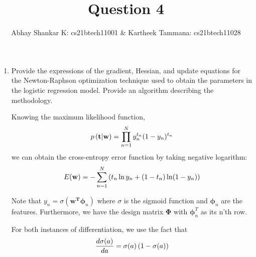 \documentclass[reqno]{amsart}
\begin{document}
    \title{Question 4}
    \author{Abhay Shankar K: cs21btech11001 \& Kartheek Tammana: cs21btech11028}
    \maketitle

    \begin{enumerate}[label=\textbf{(\Roman*)}]
        \item \question Provide the expressions of the gradient, Hessian, and update equations for the Newton-Raphson optimization technique used to obtain the parameters in the logistic regression model. Provide an algorithm describing the methodology.
        
        \solution
        Knowing the maximum likelihood function, 
        \[p\left({\mathbf{t}} \middle| {\mathbf{w}}\right) = \prod_{n = 1}^{N} y_n^{t_n} (1 - y_n)^{t_n}\]
        we can obtain the cross-entropy error function by taking negative logarithm: 
        \begin{equation}
            E(\mathbf{w}) = - \sum_{n = 1}^{N} \left(t_n \ln y_n + (1 - t_n) \ln (1 - y_n)\right) \label{eq:cross-entropy}
        \end{equation}
        
        Note that \(y_n = \sigma(\mathbf{w^T}\boldsymbol{\phi}_n)\) where \(\sigma\) is the sigmoid function and \(\boldsymbol{\phi}_n\) are the features. 
        Furthermore, we have the design matrix \(\mathbf{\Phi}\) with \(\boldsymbol{\phi}_n^T\) as its n'th row.

        For both instances of differentiation, we use the fact that \[\frac{d \sigma(a)}{da} = \sigma(a)\left(1 - \sigma(a)\right)\]


\end{enumerate}
\end{document}
